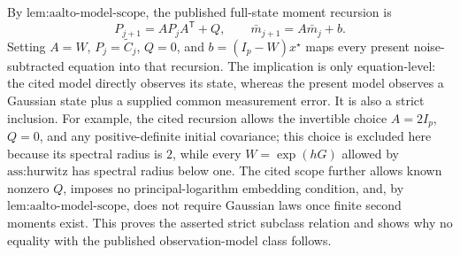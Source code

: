 By \(\text{lem:aalto-model-scope}\), the published full-state moment recursion is
\[
 P_{j+1}=AP_jA^{\mathsf T}+Q,
 \qquad
 \bar m_{j+1}=A\bar m_j+b.
\]
Setting \(A=W\), \(P_j=\widetilde C_j\), \(Q=0\), and \(b=(I_p-W)x^\star\) maps every present noise-subtracted equation into that recursion.  The implication is only equation-level: the cited model directly observes its state, whereas the present model observes a Gaussian state plus a supplied common measurement error.  It is also a strict inclusion.  For example, the cited recursion allows the invertible choice \(A=2I_p\), \(Q=0\), and any positive-definite initial covariance; this choice is excluded here because its spectral radius is \(2\), while every \(W=\exp(hG)\) allowed by \(\text{ass:hurwitz}\) has spectral radius below one.  The cited scope further allows known nonzero \(Q\), imposes no principal-logarithm embedding condition, and, by \(\text{lem:aalto-model-scope}\), does not require Gaussian laws once finite second moments exist.  This proves the asserted strict subclass relation and shows why no equality with the published observation-model class follows.


